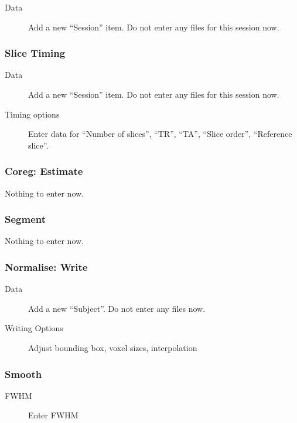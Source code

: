 \begin{description}
\item[Data] Add a new ``Session'' item. Do not enter any files for this
  session now.
\end{description}

\subsubsection*{Slice Timing}

\begin{description}
\item[Data] Add a new ``Session'' item. Do not enter any files for this
  session now.
\item[Timing options] Enter data for ``Number of slices'', ``TR'', ``TA'',
  ``Slice order'', ``Reference slice''.
\end{description}

\subsubsection*{Coreg: Estimate} 

Nothing to enter now.

\subsubsection*{Segment}

 Nothing to enter now.

\subsubsection*{Normalise: Write}

\begin{description}
\item[Data] Add a new ``Subject''. Do not enter any files now.
\item[Writing Options] Adjust bounding box, voxel sizes, interpolation
\end{description}

\subsubsection*{Smooth}

\begin{description}
\item[FWHM] Enter FWHM
\end{description}

